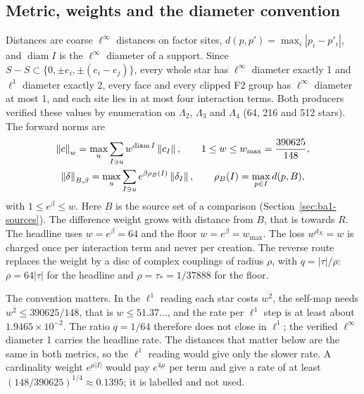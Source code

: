 \subsection{Metric, weights and the diameter convention}
\label{sec:ba1-metric}
Distances are coarse $\ell^\infty$ distances on factor sites,
$d(p,p')=\max_i|p_i-p'_i|$, and $\operatorname{diam}I$ is the $\ell^\infty$
diameter of a support. Since
$S-S\subset\{0,\pm e_i,\pm(e_i-e_j)\}$, every whole star has $\ell^\infty$
diameter exactly 1 and $\ell^1$ diameter exactly 2, every face and every
clipped F2 group has $\ell^\infty$ diameter at most 1, and each site lies in
at most four interaction terms. Both producers verified these values by
enumeration on $\Lambda_2$, $\Lambda_3$ and $\Lambda_4$ (64, 216 and 512
stars). The forward norms are
\begin{equation}
 \begin{gathered}
 \left\lVert c\right\rVert_w=\max_u\sum_{I\ni u}w^{\operatorname{diam}I}\left\lVert c_I\right\rVert,\qquad
 1\le w\le w_{\max}=\frac{390625}{148},\\
 \left\lVert\delta\right\rVert_{B,\beta}=\max_u\sum_{I\ni u}e^{\beta\rho_B(I)}\left\lVert\delta_I\right\rVert,\qquad
 \rho_B(I)=\max_{p\in I}d(p,B),
 \end{gathered}
 \label{eq:ba1-norms}
\end{equation}
with $1\le e^\beta\le w$. Here $B$ is the source set of a comparison
(Section~\ref{sec:ba1-sources}). The difference weight grows with distance
from $B$, that is towards $R$. The headline uses $w=e^\beta=64$ and the floor
$w=e^\beta=w_{\max}$. The loss $w^{d_X}=w$ is charged once per interaction
term and never per creation. The reverse route replaces the weight by a disc
of complex couplings of radius $\rho$, with $q=|\tau|/\rho$: $\rho=64|\tau|$
for the headline and $\rho=\tau_*=1/37888$ for the floor.

The convention matters. In the $\ell^1$ reading each star costs $w^2$, the
self-map needs $w^2\le390625/148$, that is $w\le51.37\ldots$, and the rate
per $\ell^1$ step is at least about $1.9465\times10^{-2}$. The ratio $q=1/64$
therefore does not close in $\ell^1$; the verified $\ell^\infty$ diameter 1
carries the headline rate. The distances that matter below are the same in
both metrics, so the $\ell^1$ reading would give only the slower rate. A
cardinality weight $e^{\mu|I|}$ would pay $e^{4\mu}$ per term and give a rate
of at least $(148/390625)^{1/4}\approx0.1395$; it is labelled and not used.

